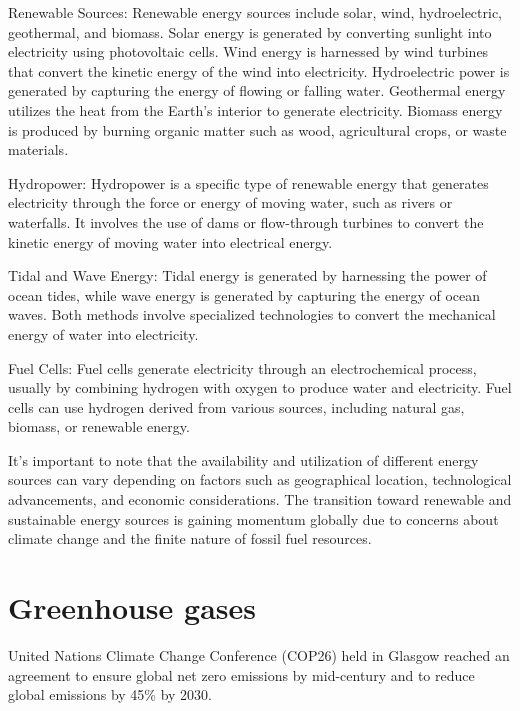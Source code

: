 \documentclass[
  a4paper,  %
  twoside,  %
  bibliography=totoc,
  headsepline,
  cleardoublepage=empty,
  parskip=half,
  draft=false
]{scrbook}
\begin{document}
Renewable Sources: Renewable energy sources include solar, wind, hydroelectric, geothermal, and biomass. Solar energy is generated by converting sunlight into electricity using photovoltaic cells. Wind energy is harnessed by wind turbines that convert the kinetic energy of the wind into electricity. Hydroelectric power is generated by capturing the energy of flowing or falling water. Geothermal energy utilizes the heat from the Earth's interior to generate electricity. Biomass energy is produced by burning organic matter such as wood, agricultural crops, or waste materials\cite{owid-renewable-energy}.

Hydropower: Hydropower is a specific type of renewable energy that generates electricity through the force or energy of moving water, such as rivers or waterfalls. It involves the use of dams or flow-through turbines to convert the kinetic energy of moving water into electrical energy\cite{sipahutar2013renewable}.

Tidal and Wave Energy: Tidal energy is generated by harnessing the power of ocean tides, while wave energy is generated by capturing the energy of ocean waves. Both methods involve specialized technologies to convert the mechanical energy of water into electricity\cite{khan2017review}.

Fuel Cells: Fuel cells generate electricity through an electrochemical process, usually by combining hydrogen with oxygen to produce water and electricity. Fuel cells can use hydrogen derived from various sources, including natural gas, biomass, or renewable energy\cite{mekhilef2012comparative}.

It's important to note that the availability and utilization of different energy sources can vary depending on factors such as geographical location, technological advancements, and economic considerations\cite{firozjaei2020effect}\cite{kryzia2019dampening}\cite{abas2015review}. The transition toward renewable and sustainable energy sources is gaining momentum globally due to concerns about climate change and the finite nature of fossil fuel resources\cite{qazi2019towards}.

\section{Greenhouse gases}
United Nations Climate Change Conference (COP26) held in Glasgow reached an agreement to ensure global net zero emissions by mid-century and to reduce global emissions by 45\% by 2030\cite{Arora_Mishra_2021}. 
\end{document}
